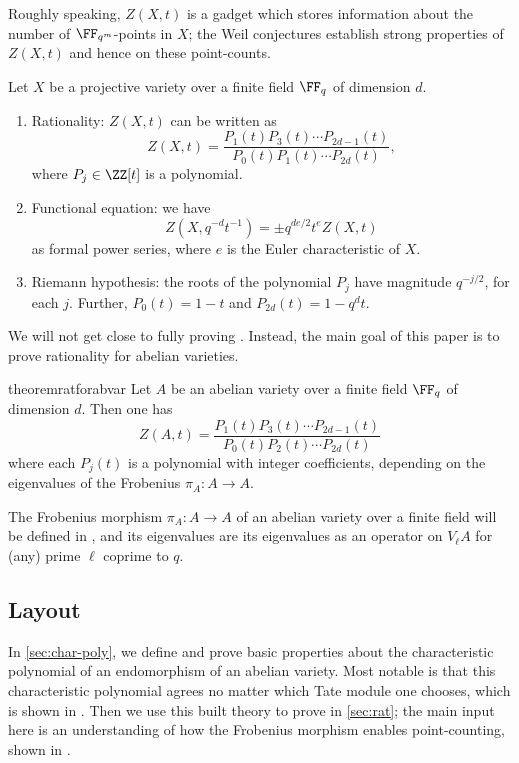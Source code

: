 \documentclass{amsart}
\begin{document}
Roughly speaking, $Z(X,t)$ is a gadget which stores information about the number of $\FF_{q^m}$-points in $X$; the Weil conjectures establish strong properties of $Z(X,t)$ and hence on these point-counts.
\begin{theorem} \label{thm:weil}
	Let $X$ be a projective variety over a finite field $\FF_q$ of dimension $d$.
	\begin{enumerate}
		\item Rationality: $Z(X,t)$ can be written as
		\[Z(X,t)=\frac{P_1(t)P_3(t)\cdots P_{2d-1}(t)}{P_0(t)P_1(t)\cdots P_{2d}(t)},\]
		where $P_j\in\ZZ[t]$ is a polynomial.
		\item Functional equation: we have
		\[Z\left(X,q^{-d}t^{-1}\right)=\pm q^{de/2}t^eZ(X,t)\]
		as formal power series, where $e$ is the Euler characteristic of $X$.
		\item Riemann hypothesis: the roots of the polynomial $P_j$ have magnitude $q^{-j/2}$, for each $j$. Further, $P_0(t)=1-t$ and $P_{2d}(t)=1-q^dt$.
	\end{enumerate}
\end{theorem}
We will not get close to fully proving . Instead, the main goal of this paper is to prove rationality for abelian varieties.
\begin{restatable}[Rationality]{theorem}{ratforabvar} \label{thm:rationality}
	Let $A$ be an abelian variety over a finite field $\FF_q$ of dimension $d$. Then one has
	\[Z(A,t)=\frac{P_1(t)P_3(t)\cdots P_{2d-1}(t)}{P_0(t)P_2(t)\cdots P_{2d}(t)}\]
	where each $P_j(t)$ is a polynomial with integer coefficients, depending on the eigenvalues of the Frobenius $\pi_A\colon A\to A$.
\end{restatable}
The Frobenius morphism $\pi_A\colon A\to A$ of an abelian variety over a finite field will be defined in , and its eigenvalues are its eigenvalues as an operator on $V_\ell A$ for (any) prime $\ell$ coprime to $q$.

\subsection{Layout}
In \cref{sec:char-poly}, we define and prove basic properties about the characteristic polynomial of an endomorphism of an abelian variety. Most notable is that this characteristic polynomial agrees no matter which Tate module one chooses, which is shown in . Then we use this built theory to prove  in \cref{sec:rat}; the main input here is an understanding of how the Frobenius morphism enables point-counting, shown in .
\end{document}
